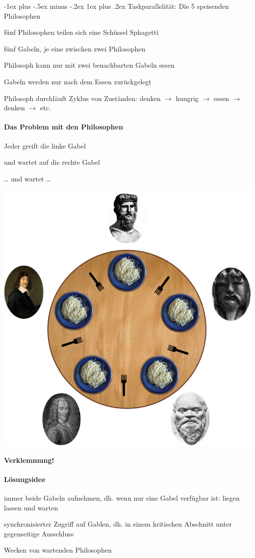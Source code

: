 \documentclass[10pt]{article}
\makeatletter
\renewcommand{\subsubsection}{\@startsection{subsubsection}{3}{0mm}%
                                {-1ex plus -.5ex minus -.2ex}%
                                {1ex plus .2ex}%
                                {\normalfont\small\bfseries}}
\makeatother
\begin{document}
  \subsubsection{Taskparallelität: Die 5 speisenden Philosophen}
  \begin{itemize*}
    \item fünf Philosophen teilen sich eine Schüssel Sphagetti
    \item fünf Gabeln, je eine zwischen zwei Philosophen
    \item Philosoph kann nur mit zwei benachbarten Gabeln essen
    \item Gabeln werden nur nach dem Essen zurückgelegt
    \item Philosoph durchläuft Zyklus von Zuständen: denken $\rightarrow$ hungrig $\rightarrow$ essen $\rightarrow$ denken $\rightarrow$ etc.
  \end{itemize*}
  
  \paragraph{Das Problem mit den Philosophen}
  
  \begin{itemize*}
    \item Jeder greift die linke Gabel
    \item und wartet auf die rechte Gabel
    \item … und wartet …
  \end{itemize*}
  \begin{center}
    \includegraphics[width=0.3\linewidth]{Assets/Programmierparadigmen-philosophen}
  \end{center}
  \color{orange} \textbf{Verklemmung!} \color{black}
  
  \paragraph{Lösungsidee}
  
  \begin{itemize*}
    \item immer beide Gabeln aufnehmen, dh. wenn nur eine Gabel verfügbar ist: liegen lassen und warten
    \item synchronisierter Zugriff auf Gablen, dh. in einem kritischen Abschnitt unter gegenseitige Ausschluss
    \item Wecken von wartenden Philosophen
  \end{itemize*}
  
\end{document}
